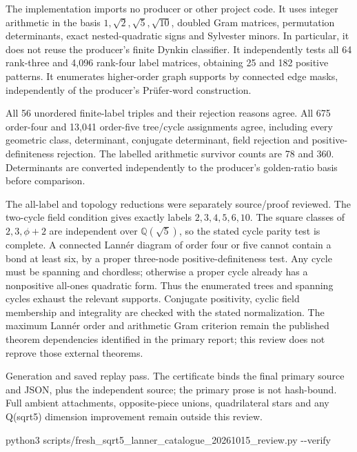 \documentclass[
  10pt,
]{report}
\newenvironment{Shaded}{}{}
\newcommand{\AttributeTok}[1]{\textcolor[rgb]{0.49,0.56,0.16}{#1}}
\newcommand{\ExtensionTok}[1]{#1}
\newcommand{\NormalTok}[1]{#1}
\begin{document}
The implementation imports no producer or other project code. It uses
integer arithmetic in the basis \(1,\sqrt2,\sqrt5,\sqrt{10}\), doubled
Gram matrices, permutation determinants, exact nested-quadratic signs
and Sylvester minors. In particular, it does not reuse the producer's
finite Dynkin classifier. It independently tests all 64 rank-three and
4,096 rank-four label matrices, obtaining 25 and 182 positive patterns.
It enumerates higher-order graph supports by connected edge masks,
independently of the producer's Prüfer-word construction.

All 56 unordered finite-label triples and their rejection reasons agree.
All 675 order-four and 13,041 order-five tree/cycle assignments agree,
including every geometric class, determinant, conjugate determinant,
field rejection and positive-definiteness rejection. The labelled
arithmetic survivor counts are 78 and 360. Determinants are converted
independently to the producer's golden-ratio basis before comparison.

The all-label and topology reductions were separately source/proof
reviewed. The two-cycle field condition gives exactly labels
\(2,3,4,5,6,10\). The square classes of \(2,3,\phi+2\) are independent
over \(\mathbb Q(\sqrt5)\), so the stated cycle parity test is complete.
A connected Lannér diagram of order four or five cannot contain a bond
at least six, by a proper three-node positive-definiteness test. Any
cycle must be spanning and chordless; otherwise a proper cycle already
has a nonpositive all-ones quadratic form. Thus the enumerated trees and
spanning cycles exhaust the relevant supports. Conjugate positivity,
cyclic field membership and integrality are checked with the stated
normalization. The maximum Lannér order and arithmetic Gram criterion
remain the published theorem dependencies identified in the primary
report; this review does not reprove those external theorems.

Generation and saved replay pass. The certificate binds the final
primary source and JSON, plus the independent source; the primary prose
is not hash-bound. Full ambient attachments, opposite-piece unions,
quadrilateral stars and any Q(sqrt5) dimension improvement remain
outside this review.

\begin{Shaded}
\begin{Highlighting}[]
\ExtensionTok{python3}\NormalTok{ scripts/fresh\_sqrt5\_lanner\_catalogue\_20261015\_review.py }\AttributeTok{{-}{-}verify}
\end{Highlighting}
\end{Shaded}
\end{document}

